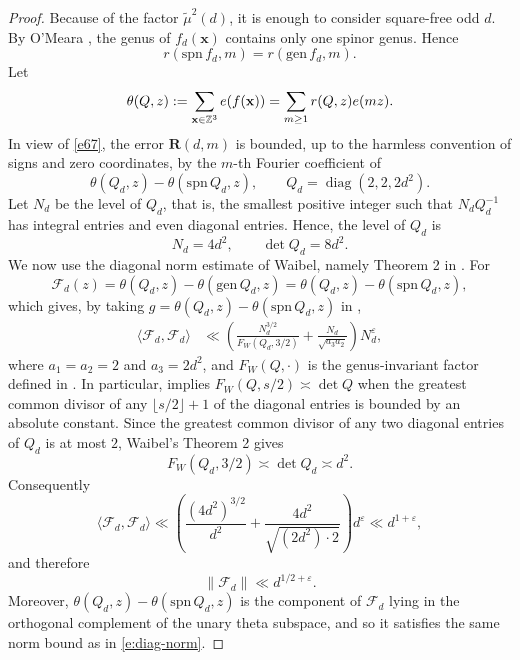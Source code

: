 \documentclass[10pt,a4paper]{amsart}
\numberwithin{equation}{section}
\def\Z{{\mathbb Z}}
\begin{document}
\begin{proof}
Because of the factor $\widetilde\mu^2(d)$, it is enough to consider square-free odd $d$. By O'Meara \cite[Theorem 102:10]{OM}, the genus of
\(
f_d(\mathbf x)
\)
contains only one spinor genus. Hence
\[
r(\mathrm{spn}\,f_d,m)=r(\mathrm{gen}\,f_d,m).
\]
Let 
\[
\theta(Q,z):=\sum_{{\bf x} \in \Z^3} e(f({\bf x}))=\sum_{m \geq1}r(Q,z)e(mz).
\]
In view of \eqref{e67}, the error $\mathbf R(d,m)$ is bounded, up to the harmless convention of signs and zero coordinates, by the $m$-th Fourier coefficient of
\[
\theta(Q_d,z)-\theta(\mathrm{spn}\,Q_d,z),
\qquad
Q_d=\operatorname{diag}(2,2,2d^2).
\]
Let $N_d$ be the level of $Q_d$, that is, the smallest positive integer such that $N_dQ_d^{-1}$ has integral entries and even diagonal entries. Hence, the level of $Q_d$ is
\[
N_d=4d^2,
\qquad
\det Q_d=8d^2.
\]
We now use the diagonal norm estimate of Waibel, namely Theorem 2 in \cite{Wa}. For
\[
\mathcal F_d(z)=\theta(Q_d,z)-\theta(\mathrm{gen}\,Q_d,z)=\theta(Q_d,z)-\theta(\mathrm{spn}\,Q_d,z),
\]
which gives, by taking $g=\theta(Q_d,z)-\theta(\mathrm{spn}\,Q_d,z)$ in \cite[Theorem 2]{Wa},
\begin{align*}
\langle\mathcal F_d,\mathcal F_d\rangle
&\ll
\left(
\frac{N_d^{3/2}}{F_W(Q_d,3/2)}+
\frac{N_d}{\sqrt{a_3a_2}}
\right)N_d^\varepsilon,
\end{align*}
where $a_1=a_2=2$ and $a_3=2d^2$, and $F_W(Q,\cdot)$ is the genus-invariant factor defined in \cite[(6)]{Wa}. In particular, \cite[Theorem 2]{Wa} implies
$F_W(Q,s/2)\asymp\det Q$ when the greatest common divisor of any $\lfloor s/2\rfloor+1$ of the diagonal entries is bounded by an absolute constant. Since the greatest common divisor of any two diagonal entries of $Q_d$ is at most $2$, Waibel's Theorem 2 gives
\[
F_W(Q_d,3/2)\asymp \det Q_d\asymp d^2.
\]
Consequently
\[
\langle\mathcal F_d,\mathcal F_d\rangle
\ll
\left(\frac{(4d^2)^{3/2}}{d^2}+
\frac{4d^2}{\sqrt{(2d^2)\cdot2}}
\right)d^\varepsilon
\ll d^{1+\varepsilon},
\]
and therefore
\begin{equation}\label{e:diag-norm}
\|\mathcal F_d\|\ll d^{1/2+\varepsilon}.
\end{equation}
Moreover,
$\theta(Q_d,z)-\theta(\mathrm{spn}\,Q_d,z)$ is the component of $\mathcal F_d$ lying in the orthogonal complement of the unary theta subspace, and so it satisfies the same norm bound as in \eqref{e:diag-norm}.


\end{proof}
\end{document}
